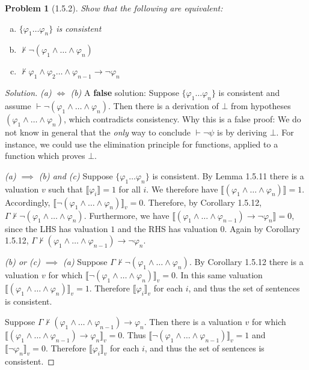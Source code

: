 \documentclass[letter]{article}
\newtheorem{problem}{Problem}
\theoremstyle{definition}
\newenvironment{solution}
{\begin{proof}[Solution]}
        {\end{proof}}
\renewcommand{\phi}{\varphi}
\begin{document}
\begin{problem}[1.5.2] Show that the following are equivalent:
    \begin{enumerate}[(a)]
        \item $\{\phi_1 \ldots \phi_n\}$ is consistent
        \item $\not \vdash \neg (\phi_1 \land \ldots \land \phi_n)$
        \item $\not \vdash \phi_1 \land \phi_2 \ldots \land \phi_{n-1}\to \neg \phi_n$
    \end{enumerate}
\end{problem}
\begin{solution}
    \textit{(a) $\iff$ (b)} A \textbf{false} solution:
    Suppose $\{\phi_1 \ldots \phi_n\}$ is consistent and assume $\vdash \neg (\phi_1 \land \ldots \land \phi_n)$. Then there is a derivation of $\bot$ from hypotheses $(\phi_1 \land \ldots \land \phi_n)$, which contradicts consistency. Why this is a false proof: We do not know in general that the \textit{only} way to conclude $\vdash \neg \psi$ is by deriving $\bot$. For instance, we could use the elimination principle for functions, applied to a function which proves $\bot$.

    \textit{(a) $\implies$ (b) and (c)} Suppose $\{\phi_1 \ldots \phi_n\}$ is consistent.
    By Lemma 1.5.11 there is a valuation $v$ such that $\llbracket \phi_i \rrbracket = 1$ for all $i$. We therefore have $\llbracket (\phi_1 \land \ldots \land \phi_n) \rrbracket = 1$. Accordingly, $\llbracket \neg (\phi_1 \land \ldots \land \phi_n) \rrbracket_v = 0$. Therefore, by Corollary 1.5.12, $\Gamma \not \vdash \neg (\phi_1 \land \ldots \land \phi_n)$.
    Furthermore, we have $\llbracket (\phi_1 \land \ldots \land \phi_{n-1}) \to \neg \phi_n \rrbracket = 0$, since the LHS has valuation $1$ and the RHS has valuation $0$. Again by Corollary 1.5.12, $\Gamma \not \vdash (\phi_1 \land \ldots \land \phi_{n-1}) \to \neg \phi_n $.

    \textit{(b) or (c) $\implies$ (a)} Suppose $\Gamma \not \vdash \neg (\phi_1 \land \ldots \land \phi_n)$. By Corollary 1.5.12 there is a valuation $v$ for which $\llbracket \neg (\phi_1 \land \ldots \land \phi_n) \rrbracket_v = 0$. In this same valuation $\llbracket (\phi_1 \land \ldots \land \phi_n) \rrbracket_v = 1$. Therefore $\llbracket \phi_i \rrbracket_v$ for each $i$, and thus the set of sentences is consistent.

    Suppose $\Gamma \not \vdash (\phi_1 \land \ldots \land \phi_{n-1}) \to \phi_n $. Then there is a valuation $v$ for which $\llbracket (\phi_1 \land \ldots \land \phi_{n-1}) \to \phi_n \rrbracket_v = 0$. Thus $\llbracket \neg (\phi_1 \land \ldots \land \phi_{n-1}) \rrbracket_v = 1$ and $\llbracket \neg  \phi_n \rrbracket_v = 0$. Therefore $\llbracket \phi_i \rrbracket_v$ for each $i$, and thus the set of sentences is consistent.

\end{solution}
\end{document}
